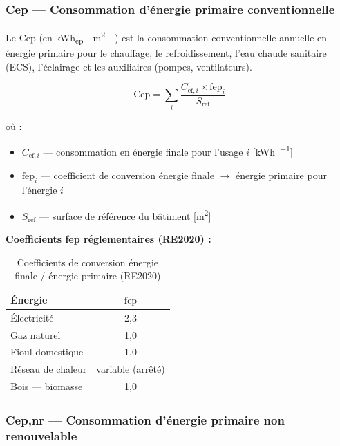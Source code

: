 \subsubsection{Cep — Consommation d'énergie primaire conventionnelle}

\begin{definition}[title=Cep — Consommation en énergie primaire]
Le Cep (en \si{\kWh_{ep} \per \m^2 \per \year}) est la consommation conventionnelle annuelle en énergie primaire pour le chauffage, le refroidissement, l'eau chaude sanitaire (ECS), l'éclairage et les auxiliaires (pompes, ventilateurs).
\end{definition}

\begin{equation}
  \text{Cep} = \sum_{i} \frac{C_{\text{ef},i} \times \text{fep}_i}{S_{\text{ref}}}
  \label{eq:cep}
\end{equation}

où :
\begin{itemize}
  \item $C_{\text{ef},i}$ — consommation en énergie finale pour l'usage $i$ [\si{\kWh \per \year}]
  \item $\text{fep}_i$ — coefficient de conversion énergie finale $\rightarrow$ énergie primaire pour l'énergie $i$
  \item $S_{\text{ref}}$ — surface de référence du bâtiment [\si{\m^2}]
\end{itemize}

\medskip
\noindent\textbf{Coefficients fep réglementaires (RE2020) :}

\begin{table}[H]
  \centering
  \begin{tabular}{lc}
    \toprule
    Énergie & $\text{fep}$ \\
    \midrule
    Électricité & 2,3 \\
    Gaz naturel & 1,0 \\
    Fioul domestique & 1,0 \\
    Réseau de chaleur & variable (arrêté) \\
    Bois — biomasse & 1,0 \\
    \bottomrule
  \end{tabular}
  \caption{Coefficients de conversion énergie finale / énergie primaire (RE2020)}
\end{table}

\subsubsection{Cep,nr — Consommation d'énergie primaire non renouvelable}

